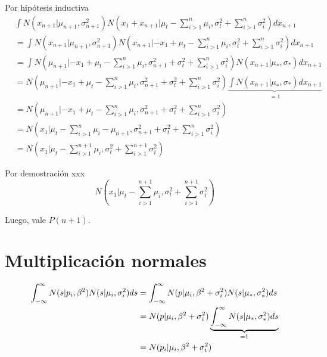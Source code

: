 \documentclass[11pt,twoside,spanish]{report} %
\begin{document}
Por hip\'otesis inductiva
\begin{equation}
	\begin{split}
		&\int N(x_{n+1}|\mu_{n+1},\sigma_{n+1}^2) N\left(x_1+x_{n+1}|\mu_t-\sum_{i>1}^n \mu_i,\sigma_t^2+\sum_{i>1}^n\sigma_i^2\right) dx_{n+1} \\
		&=\int N(x_{n+1}|\mu_{n+1},\sigma_{n+1}^2) N\left(x_{n+1}|-x_1+\mu_t-\sum_{i>1}^n \mu_i,\sigma_t^2+\sum_{i>1}^n\sigma_i^2\right) dx_{n+1} \\
		&=\int N(\mu_{n+1}|-x_1+\mu_t-\sum_{i>1}^n \mu_i,\sigma_{n+1}^2+\sigma_t^2+\sum_{i>1}^n\sigma_i^2) N\left(x_{n+1}|\mu_{\ast},\sigma_{\ast}\right) dx_{n+1} \\
		&= N(\mu_{n+1}|-x_1+\mu_t-\sum_{i>1}^n \mu_i,\sigma_{n+1}^2+\sigma_t^2+\sum_{i>1}^n\sigma_i^2) \underbrace{\int N\left(x_{n+1}|\mu_{\ast},\sigma_{\ast}\right) dx_{n+1}}_{=1} \\
		&= N(\mu_{n+1}|-x_1+\mu_t-\sum_{i>1}^n \mu_i,\sigma_{n+1}^2+\sigma_t^2+\sum_{i>1}^n\sigma_i^2)\\
		&= N(x_1|\mu_t-\sum_{i>1}^n \mu_i-\mu_{n+1},\sigma_{n+1}^2+\sigma_t^2+\sum_{i>1}^n\sigma_i^2)\\
		&= N(x_1|\mu_t-\sum_{i>1}^{n+1} \mu_i,\sigma_t^2+\sum_{i>1}^{n+1}\sigma_i^2)
	\end{split}
\end{equation}

Por demostraci\'on xxx%
\begin{equation}
	N\left(x_1|\mu_t-\sum_{i>1}^{n+1} \mu_i,\sigma_t^2+\sum_{i>1}^{n+1}\sigma_i^2\right)
\end{equation}

Luego, vale $P(n+1)$.


\section{Multiplicaci\'on normales}

\begin{equation}
	\centering
	\begin{split}
		\int_{-\infty}^{\infty} N(s \vert p_i,\beta^2) N(s \vert \mu_i,\sigma_i^2)ds
		& = \int_{-\infty}^{\infty} N(p \vert \mu_i,\beta^2+\sigma_i^2) N(s \vert \mu_{\ast},\sigma_{\ast}^2)ds \\
		& = N(p \vert \mu_i,\beta^2+\sigma_i^2) \underbrace{\int_{-\infty}^{\infty}  N(s \vert \mu_{\ast},\sigma_{\ast}^2)ds}_{=1} \\
		& =  N(p_i \vert \mu_i,\beta^2+\sigma_i^2)
	\end{split}
\end{equation}
\end{document}
